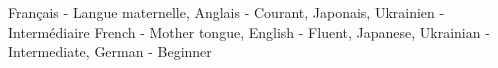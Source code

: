 
\fi


\vspace{\ItemsSpacing}

\ifnativelang
{}
{Fran\c cais - \textmd{Langue maternelle,} Anglais - \textmd{Courant,} Japonais, Ukrainien - \textmd{Interm\'ediaire}}{}{}{}{}
\else
{}
{French - \textmd{Mother tongue,} English - \textmd{Fluent,} Japanese, Ukrainian - \textmd{Intermediate,}  German - \textmd{Beginner}}{}{}{}{}
\fi









